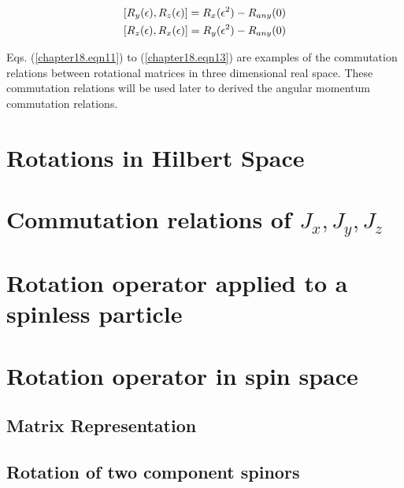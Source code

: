 \begin{align}
\label{chapter18.eqn12}
\comm{R_y(\epsilon)}{R_z(\epsilon)} = R_x(\epsilon^2) - R_{any}(0)\\
\label{chapter18.eqn13}
\comm{R_z(\epsilon)}{R_x(\epsilon)} = R_y(\epsilon^2) - R_{any}(0)
\end{align}

Eqs. (\ref{chapter18.eqn11}) to (\ref{chapter18.eqn13}) are examples of the commutation relations between rotational matrices in three dimensional real space. These commutation relations will be used later to derived the angular momentum commutation relations.



\section{Rotations in Hilbert Space}





\section{Commutation relations of $J_x,J_y,J_z$}


\section{Rotation operator applied to a spinless particle}


\section{Rotation operator in spin space}
\subsection{Matrix Representation}

\subsection{Rotation of two component spinors}



